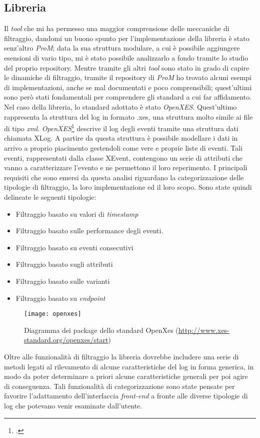 \subsection{Libreria}
 Il \textit{tool} che mi ha permesso una maggior comprensione delle meccaniche di filtraggio, dandomi un buono spunto per l'implementazione della libreria è stato senz'altro \textit{ProM}; data la sua struttura modulare, a cui è possibile aggiungere esensioni di vario tipo, mi è stato possibile analizzarlo a fondo tramite lo studio del proprio repository. Mentre tramite gli altri \textit{tool} sono stato in grado di capire le dinamiche di filtraggio, tramite il repository di \textit{ProM} ho trovato alcuni esempi di implementazioni, anche se mal documentati e poco comprensibili; quest'ultimi sono però stati fondamentali per comprendere gli standard a cui far affidamento. Nel caso della libreria, lo standard adottato è stato \textit{OpenXES}. Quest'ultimo rappresenta la struttura del log in formato .xes, una struttura molto simile ai file di tipo \textit{xml}. \textit{OpenXES}\footcite{OpenXES: http://www.xes-standard.org/openxes/start} descrive il log degli eventi tramite una struttura dati chiamata XLog. A partire da questa struttura è possibile modellare i dati in arrivo a proprio piacimento gestendoli come vere e proprie liste di eventi. Tali eventi, rappresentati dalla classe XEvent, contengono un serie di attributi che vanno a caratterizzare l'evento e ne permettono il loro reperimento. I principali requisiti che sono emersi da questa analisi riguardano la categorizzazione delle tipologie di filtraggio, la loro implementazione ed il loro scopo. Sono state quindi delineate le seguenti tipologie:
\begin{itemize}
	\item Filtraggio basato su valori di \textit{timestamp}
	\item Filtraggio basato sulle performance degli eventi.
	\item Filtraggio basato su eventi consecutivi
	\item Filtraggio basato sugli attributi
	\item Filtraggio basato sulle varianti
	\item Filtraggio basato su \textit{endpoint}
\end{itemize}
\begin{figure}[!h] 
	\centering 
	\texttt{[image: openxes]} 
	\caption{Diagramma dei package dello standard OpenXes (\url{http://www.xes-standard.org/openxes/start})}
\end{figure}
Oltre alle funzionalità di filtraggio la libreria dovrebbe includere una serie di metodi legati al rilevamento di alcune caratteristiche del log in forma generica, in modo da poter determinare a priori alcune caratteristiche generali per poi agire di conseguenza.
Tali funzionalità di categorizzazione sono state pensate per favorire l'adattamento dell'interfaccia \textit{front-end} a fronte alle diverse tipologie di log che potevano venir esaminate dall'utente.
\newpage

